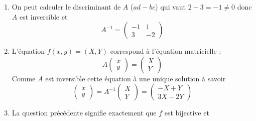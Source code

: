 \documentclass[a4paper, 11pt,reqno]{article}
\begin{document}
\begin{correction}
\begin{enumerate}
\item On peut calculer le discriminant de $A$ ($ad-bc$) qui vaut $2-3=-1\neq 0$ donc $A$ est inversible et 
$$A^{-1} = \begin{pmatrix}
-1 & 1\\
3& -2
\end{pmatrix}$$
\item L'équation $f(x,y)=(X,Y)$ correspond à l'équation matricielle : 
$$A \begin{pmatrix}
x\\
y
\end{pmatrix}= \begin{pmatrix}
X\\
Y
\end{pmatrix}$$
Comme $A$ est inversible cette équation à une unique solution à savoir 
$$ \begin{pmatrix}
x\\
y
\end{pmatrix}= A^{-1}\begin{pmatrix}
X\\
Y
\end{pmatrix} = \begin{pmatrix}
-X+Y\\
3X-2Y
\end{pmatrix}$$
\item La question précédente signifie exactement que $f$ est bijective et 
\end{enumerate}
\end{correction}

\vspace{0.5cm}
\end{document}
